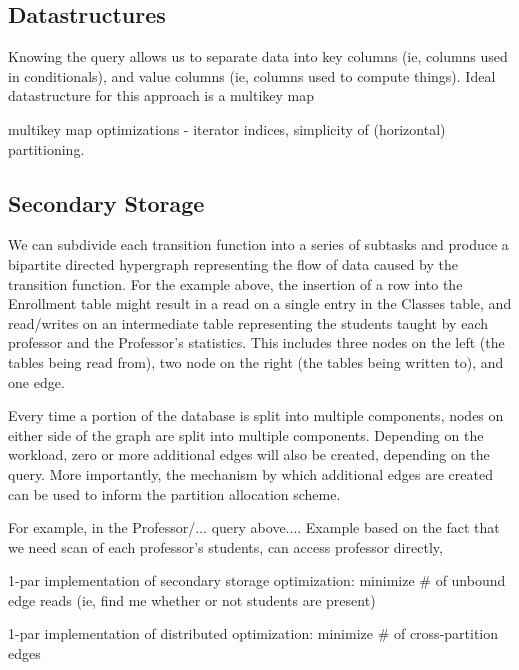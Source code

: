 \subsection{Datastructures}
Knowing the query allows us to separate data into key columns (ie, columns used in conditionals), and value columns (ie, columns used to compute things).  Ideal datastructure for this approach is a multikey map

multikey map optimizations - iterator indices, simplicity of (horizontal) partitioning.

\subsection{Secondary Storage}
We can subdivide each transition function into a series of subtasks and produce a bipartite directed hypergraph representing the flow of data caused by the transition function.  For the example above, the insertion of a row into the Enrollment table might result in a read on a single entry in the Classes table, and read/writes on an intermediate table representing the students taught by each professor and the Professor's statistics.  This includes three nodes on the left (the tables being read from), two node on the right (the tables being written to), and one edge.

Every time a portion of the database is split into multiple components, nodes on either side of the graph are split into multiple components.  Depending on the workload, zero or more additional edges will also be created, depending on the query.  More importantly, the mechanism by which additional edges are created can be used to inform the partition allocation scheme.  

For example, in the Professor/... query above....  Example based on the fact that we need scan of each professor's students, can access professor directly, 

1-par implementation of secondary storage optimization: minimize \# of unbound
edge reads (ie, find me whether or not students are present)

1-par implementation of distributed optimization: minimize \# of cross-partition
edges

